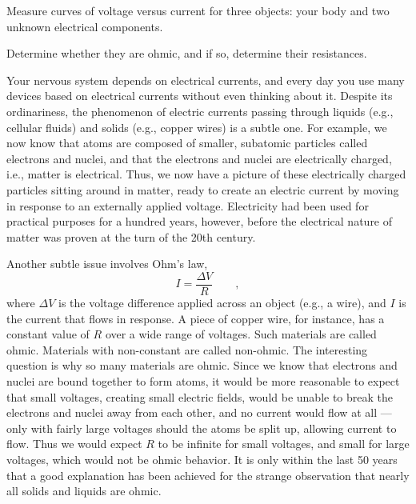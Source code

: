 \label{lab:resistance}

\apparatus
{}

\begin{goals}

\item[] Measure curves of voltage versus current for three
objects: your body and two unknown electrical components.

\item[] Determine whether they are ohmic, and if so, determine their resistances.
\end{goals}

\introduction

Your nervous system depends on electrical currents, and
every day you use many devices based on electrical currents
without even thinking about it. Despite its ordinariness,
the phenomenon of electric currents passing through liquids
(e.g., cellular fluids) and solids (e.g., copper wires) is a
subtle one. For example, we now know that atoms are composed
of smaller, subatomic particles called electrons and nuclei,
and that the electrons and nuclei are electrically charged,
i.e., matter is electrical. Thus, we now have a picture of
these electrically charged particles sitting around in
matter, ready to create an electric current by moving in
response to an externally applied voltage. Electricity had
been used for practical purposes for a hundred years,
however, before the electrical nature of matter was proven
at the turn of the 20th century.

Another subtle issue involves Ohm's law,
\begin{equation*}
       I = \frac{\Delta V}{R} \qquad ,
\end{equation*}
where $\Delta V$ is the voltage difference applied across an
object (e.g., a wire), and $I$ is the current that flows in
response. A piece of copper wire, for instance, has a
constant value of $R$  over a wide range of voltages. Such
materials are called ohmic. Materials with non-constant  are
called non-ohmic. The interesting question is why so many
materials are ohmic. Since we know that electrons and nuclei
are bound together to form atoms, it would be more
reasonable to expect that small voltages, creating small
electric fields, would be unable to break the electrons and
nuclei away from each other, and no current would flow at
all --- only with fairly large voltages should the atoms be
split up, allowing current to flow. Thus we would expect $R$
to be infinite for small voltages, and small for large
voltages, which would not be ohmic behavior. It is only
within the last 50 years that a good explanation has been
achieved for the strange observation that nearly all solids
and liquids are ohmic.

